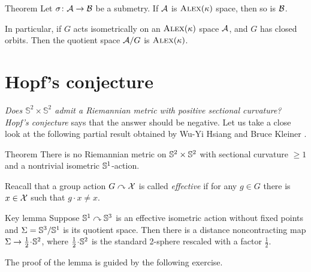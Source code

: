 \begin{thm}{Theorem}\label{thm:submetry-CBB-1}
Let $\sigma\colon\mathcal{A}\to\mathcal{B}$ be a submetry.
If $\mathcal{A}$ is $\textsc{Alex}(\kappa)$ space, then so is $\mathcal{B}$.

In particular, if $G$ acts isometrically on an $\textsc{Alex}(\kappa)$ space $\mathcal{A}$, and $G$ has closed orbits.
Then the quotient space $\mathcal{A}/G$ is $\textsc{Alex}(\kappa)$.
\end{thm}

\section{Hopf's conjecture}

\textit{Does $\mathbb{S}^2\times\mathbb{S}^2$ admit a Riemannian metric with positive sectional curvature?} \emph{Hopf's conjecture} says that the answer should be negative.
Let us take a close look at the following partial result obtained by Wu-Yi Hsiang and Bruce Kleiner \cite{hsiang-kleiner}.

\begin{thm}{Theorem}\label{thm:hsiang-kleiner}
There is no Riemannian metric on $\mathbb{S}^2\times\mathbb{S}^2$ with sectional curvature $\ge 1$ and a nontrivial isometric $\mathbb{S}^1$-action.
\end{thm}

Reacall that a group action $G\curvearrowright\mathcal{X}$ is called \emph{effective} if for any $g\in G$ there is $x\in\mathcal{X}$ such that $g\cdot x\ne x$.

\begin{thm}{Key lemma}\label{lem:S^3/S^1}
Suppose $\mathbb{S}^1\curvearrowright\mathbb{S}^3$ is an effective isometric action without fixed points
and $\Sigma=\mathbb{S}^3/\mathbb{S}^1$ is its quotient space.
Then there is a distance noncontracting map $\Sigma\to \tfrac12\cdot \SSS^2$, where $\tfrac12\cdot \SSS^2$ is the standard 2-sphere rescaled with a factor $\tfrac12$.
\end{thm}

The proof of the lemma is guided by the following exercise.

